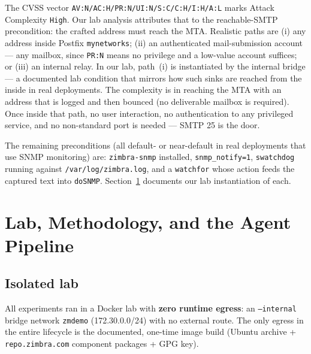 \documentclass[journal]{IEEEtran}
\begin{document}
The CVSS vector \texttt{AV:N/\hspace{0pt}AC:H/\hspace{0pt}PR:N/\hspace{0pt}UI:N/\hspace{0pt}S:C/\hspace{0pt}C:H/\hspace{0pt}I:H/\hspace{0pt}A:L} marks
Attack Complexity \texttt{High}. Our lab analysis attributes that to the
reachable-SMTP precondition: the crafted address must reach the MTA.
Realistic paths are (i) any address inside Postfix \texttt{mynetworks};
(ii) an authenticated mail-submission account — any mailbox, since
\texttt{PR:N} means no privilege and a low-value account suffices; or
(iii) an internal relay. In our lab, path~(i) is instantiated by the
internal bridge — a documented lab condition that mirrors how such sinks
are reached from the inside in real deployments.
The complexity is in reaching the MTA with an address that is logged and
then bounced (no deliverable mailbox is required). Once inside that path,
no user interaction, no authentication to any privileged service, and no
non-standard port is needed — SMTP 25 is the door.

The remaining preconditions (all default- or near-default in real
deployments that use SNMP monitoring) are: \texttt{zimbra-snmp} installed,
\texttt{snmp\_notify=1}, \texttt{swatchdog} running against
\texttt{/var/log/zimbra.log}, and a \texttt{watchfor} whose action feeds the
captured text into \texttt{doSNMP}. Section~\ref{sec:lab} documents our lab
instantiation of each.

\section{Lab, Methodology, and the Agent Pipeline}
\label{sec:lab}

\subsection{Isolated lab}

All experiments ran in a Docker lab with \textbf{zero runtime egress}: an
\texttt{--internal} bridge network \texttt{zmdemo} (172.30.0.0/24) with no
external route. The only egress in the entire lifecycle is the documented,
one-time image build (Ubuntu archive + \texttt{repo.zimbra.com} component
packages + GPG key).
\end{document}
